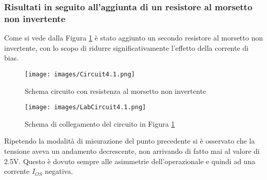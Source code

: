 \subsubsection{Risultati in seguito all'aggiunta di un resistore al morsetto non invertente}
Come si vede dalla Figura \ref{fig:Circuit4.1} è stato aggiunto un secondo resistore al morsetto non invertente, con lo scopo di ridurre significativamente l'effetto della corrente di bias.
\begin{figure}[H]
    \centering
    \texttt{[image: images/Circuit4.1.png]}
    \caption{Schema circuito con resistenza al morsetto non invertente}
    \label{fig:Circuit4.1}
\end{figure}
\begin{figure}[H]
    \centering
    \texttt{[image: images/LabCircuit4.1.png]}
    \caption{Schema di collegamento del circuito in Figura \ref{fig:Circuit4.1}}
    \label{fig:LabCircuit4.1}
\end{figure}
Ripetendo la modalità di misurazione del punto precedente si è osservato che la tensione aveva un andamento decrescente, non arrivando di fatto mai al valore di 2.5V. Questo è dovuto sempre alle asimmetrie dell'operazionale e quindi ad una corrente $I_{OS}$ negativa.